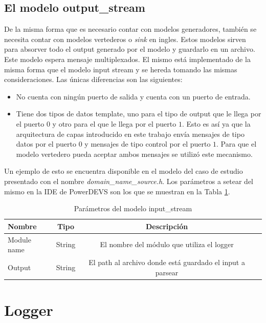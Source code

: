 \documentclass[10pt,a4paper]{article}
\begin{document}
\subsection{El modelo output\_stream}
De la misma forma que es necesario contar con modelos generadores, también se necesita contar con modelos vertederos o \textit{sink} en ingles. Estos modelos sirven para absorver todo el output generado por el modelo y guardarlo en un archivo. Este modelo espera mensaje multiplexados. El mismo está implementado de la misma forma que el modelo input stream y se hereda tomando las mismas consideraciones. Las únicas diferencias son las siguientes: \\

\begin{itemize}
\item No cuenta con ningún puerto de salida y cuenta con un puerto de entrada.
\item Tiene dos tipos de datos template, uno para el tipo de output que le llega por el puerto $0$ y otro para el que le llega por el puerto $1$. Esto es así ya que la arquitectura de capas introducido en este trabajo envía mensajes de tipo datos por el puerto $0$ y mensajes de tipo control por el puerto $1$. Para que el modelo vertedero pueda aceptar ambos mensajes se utilizó este mecanismo.
\end{itemize}

Un ejemplo de esto se encuentra disponible en el modelo del caso de estudio presentado con el nombre \textit{domain\_name\_source.h}. Los parámetros a setear del mismo en la IDE de PowerDEVS son los que se muestran en la Tabla \ref{table: output stream parameters}.
\begin{table}[h]
\begin{tabular}{|l|c|c|c|}
  \hline
  \textbf{Nombre} & \textbf{Tipo} & \textbf{Descripción} \\
  \hline
  Module name & String & El nombre del módulo que utiliza el logger \\
  \hline
  Output & String & El path al archivo donde está guardado el input a parsear \\
  \hline
\end{tabular}
\caption{Parámetros del modelo input\_stream}
\label{table: output stream parameters}
\end{table}

\section{Logger}
\end{document}
